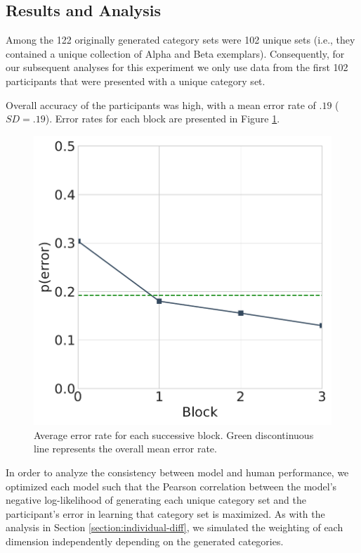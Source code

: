 \subsection{Results and Analysis}

Among the 122 originally generated category sets were 102 unique sets (i.e.,
they contained a unique collection of Alpha and Beta exemplars). Consequently,
for our subsequent analyses for this experiment we only use data from the first
102 participants that were presented with a unique category set.

Overall accuracy of the participants was high, with a mean error rate of $.19$
($SD = .19$). Error rates for each block are presented in Figure
\ref{fig:learningcurve}.

\begin{figure}
    \begin{center}
    \includegraphics[width=\textwidth/2]{figs/e3-learningcurve.pdf}
    \caption{Average error rate for each successive block. Green discontinuous
line represents the overall mean error rate.}
    \label{fig:learningcurve}
    \end{center}
\end{figure}

In order to analyze the consistency between model and human performance, we
optimized each model such that the Pearson correlation between the model's
negative log-likelihood of generating each unique category set and the
participant's error in learning that category set is maximized. As with the
analysis in Section \ref{section:individual-diff}, we simulated the weighting of
each dimension independently depending on the generated categories.

